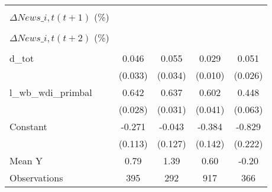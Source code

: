 {\begin{tabular}{l*{4}{c}}
                    &                     &                     &                     &                     \\
\addlinespace
$ \Delta News\_{i,t}(t+1)$ (\%)&                     &                     &                     &                     \\
                    &                     &                     &                     &                     \\
\addlinespace
$ \Delta News\_{i,t}(t+2)$ (\%)&                     &                     &                     &                     \\
                    &                     &                     &                     &                     \\
\addlinespace
d\_tot               &       0.046         &       0.055         &       0.029\sym{***}&       0.051\sym{*}  \\
                    &     (0.033)         &     (0.034)         &     (0.010)         &     (0.026)         \\
\addlinespace
l\_wb\_wdi\_primbal    &       0.642\sym{***}&       0.637\sym{***}&       0.602\sym{***}&       0.448\sym{***}\\
                    &     (0.028)         &     (0.031)         &     (0.041)         &     (0.063)         \\
\addlinespace
Constant            &      -0.271\sym{**} &      -0.043         &      -0.384\sym{***}&      -0.829\sym{***}\\
                    &     (0.113)         &     (0.127)         &     (0.142)         &     (0.222)         \\
\midrule
Mean Y              &        0.79         &        1.39         &        0.60         &       -0.20         \\
Observations        &         395         &         292         &         917         &         366         \\
\bottomrule
\end{tabular}
}
